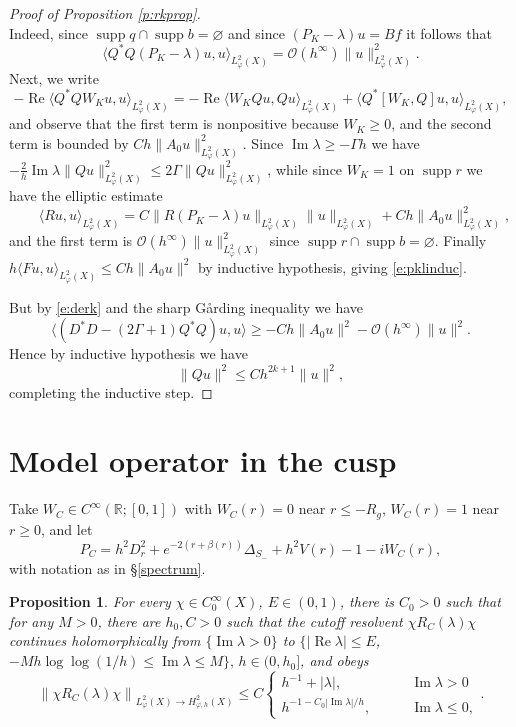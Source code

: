\documentclass[reqno, 12pt]{amsart}
\newcommand \R {\mathbb{R}}
\newcommand \Oh {\mathcal{O}}
\newcommand \la {\langle}
\newcommand \ra {\rangle}
\DeclareMathOperator \re {Re}
\DeclareMathOperator \im {Im}
\DeclareMathOperator \supp {supp}
\newtheorem{prop}{Proposition}
\theoremstyle{definition}
\numberwithin{equation}{section}
\numberwithin{prop}{section}
\numberwithin{figure}{section}
\begin{document}
\begin{proof}[Proof of Proposition \ref{p:rkprop}]
\begin{equation}
\end{equation}
Indeed, since $\supp q \cap \supp b = \varnothing$ and since $(P_K - \lambda)u = B f $  it follows that 
\[
\la Q^*Q(P_K - \lambda)u,u\ra_{L^2_\varphi(X)} = \Oh(h^\infty)\|u\|_{L^2_\varphi(X)}^2.
\]
 Next, we write
\[
- \re\la Q^*QW_K u,u\ra_{L^2_\varphi(X)} = - \re\la W_K Q u,Q u\ra_{L^2_\varphi(X)} +\la Q^*[W_K,Q]u,u\ra_{L^2_\varphi(X)},
\]
and observe that the first term is nonpositive because $W_K \ge 0$, and the second term is bounded by $C h \|A_0 u\|_{L^2_\varphi(X)}^2$. Since $\im \lambda \ge -\Gamma h$ we have $- \frac 2 h \im \lambda\|Qu\|_{L^2_\varphi(X)}^2 \le 2 \Gamma \|Qu\|^2_{L^2_\varphi(X)}$, while since $W_K=1$ on $\supp r$ we have the elliptic estimate
\[
 \qquad  \la Ru,u\ra_{L^2_\varphi(X)} = C \|R(P_K-\lambda)u\|_{L^2_\varphi(X)} \|u\|_{L^2_\varphi(X)}  + C h\|A_0 u\|^2_{L^2_\varphi(X)}, 
\]
and the first term is $\Oh(h^\infty)\|u\|^2_{L^2_\varphi(X)}$ since $\supp r \cap \supp b = \varnothing$.
Finally $h\la F u,u\ra_{L^2_\varphi(X)}  \le Ch\|A_0u\|^2$ by inductive hypothesis, giving \eqref{e:pklinduc}.

But by \eqref{e:derk} and the sharp G\aa rding inequality  we have
\[
\la (D^*D - (2\Gamma + 1)Q^*Q)u,u\ra \ge - Ch\|A_0 u\|^2 - \Oh(h^\infty)\|u\|^2.
\]
Hence  by inductive hypothesis    we have
\[
\|Q u\|^2\le Ch^{2k+1}\|u\|^2,
\]
completing the inductive step. 
\end{proof}

\section{Model operator in the cusp}\label{s:modelcusp}
Take $W_C \in C^\infty(\R;[0,1])$ with $W_C(r) = 0$ near $r \le -R_g$, $W_C(r) = 1$ near $r \ge 0$, and let
\[
P_C =  h^2D_r^2  + e^{-2(r+\beta(r))} \Delta_{S_-} + h^2V(r) - 1 - iW_C(r),
\]
with notation as in \S\ref{spectrum}.


\begin{prop} \label{p:modelbound}
For every $\chi \in C_0^\infty(X)$, $E \in (0,1)$, there is $C_0>0$ such that for any $M>0$, there are $h_0,C>0$  such that the cutoff resolvent $\chi R_C(\lambda) \chi$ continues holomorphically from $\{\im \lambda>0\}$ to $\{|\re \lambda| \le  E$, $-Mh\log\log(1/h) \le \im \lambda \le M\}, \, h \in (0,h_0]$, and obeys
\begin{equation}\label{e:modelbound}\left\|\chi R_C(\lambda) \chi\right\|_{L^2_\varphi(X) \to H^2_{\varphi,h} (X)} \le C \begin{cases}
h^{-1} + |\lambda|, \qquad & \im \lambda > 0 \\
h^{-1-C_0 |\im \lambda|/h}, \qquad &\im \lambda \le 0,
\end{cases}. \end{equation}
\end{prop}
\end{document}
